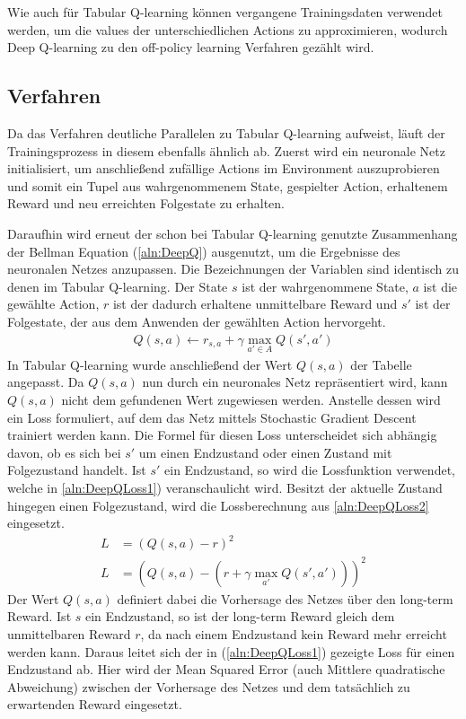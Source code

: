 \documentclass[11pt]{scrartcl}
\begin{document}
Wie auch für Tabular Q-learning können vergangene Trainingsdaten verwendet werden, um die
values der unterschiedlichen Actions zu approximieren, wodurch Deep Q-learning zu den
off-policy learning Verfahren gezählt wird.

\subsection{Verfahren}
\label{sec:deepq-procedure}
Da das Verfahren deutliche Parallelen zu Tabular Q-learning aufweist, läuft der
Trainingsprozess in diesem ebenfalls ähnlich ab. Zuerst wird ein neuronale Netz
initialisiert, um anschließend zufällige Actions im Environment auszuprobieren
und somit ein Tupel aus wahrgenommenem State, gespielter Action, erhaltenem
Reward und neu erreichten Folgestate zu erhalten.

Daraufhin wird erneut der schon bei Tabular Q-learning genutzte Zusammenhang der Bellman
Equation (\ref{aln:DeepQ}) ausgenutzt, um die Ergebnisse des neuronalen Netzes anzupassen.
Die Bezeichnungen der Variablen sind identisch zu denen im Tabular Q-learning. Der State
$s$ ist der wahrgenommene State, $a$ ist die gewählte Action, $r$ ist der dadurch
erhaltene unmittelbare Reward und $s'$ ist der Folgestate, der aus dem Anwenden der
gewählten Action hervorgeht.
\begin{align}
  Q(s, a) \leftarrow r_{s,a} + \gamma \max_{a' \in A}Q(s', a') \label{aln:DeepQ}
\end{align}
\noindent
In Tabular Q-learning wurde anschließend der Wert $Q(s, a)$ der Tabelle angepasst. Da 
$Q(s, a)$ nun durch ein neuronales Netz repräsentiert wird, kann $Q(s, a)$ nicht dem
gefundenen Wert zugewiesen werden. Anstelle dessen wird ein Loss formuliert, auf dem
das Netz mittels Stochastic Gradient Descent trainiert werden kann. Die Formel für
diesen Loss unterscheidet sich abhängig davon, ob es sich bei $s'$ um einen Endzustand
oder einen Zustand mit Folgezustand handelt. Ist $s'$ ein Endzustand, so wird die
Lossfunktion verwendet, welche in \autoref{aln:DeepQLoss1}) veranschaulicht wird.
Besitzt der aktuelle Zustand hingegen einen Folgezustand, wird die Lossberechnung
aus \autoref{aln:DeepQLoss2} eingesetzt.
\begin{align}
  L & = \left(Q(s, a) - r\right)^2 \label{aln:DeepQLoss1} \\
  L & = \left(Q(s, a) - \left(r + \gamma \max_{a'} Q(s', a')\right)\right)^2 \label{aln:DeepQLoss2}
\end{align}
\noindent
Der Wert $Q(s, a)$ definiert dabei die Vorhersage des Netzes über den long-term Reward.
Ist $s$ ein Endzustand, so ist der long-term Reward gleich dem unmittelbaren Reward $r$,
da nach einem Endzustand kein Reward mehr erreicht werden kann. Daraus leitet sich der in
(\ref{aln:DeepQLoss1}) gezeigte Loss für einen Endzustand ab. Hier wird der Mean Squared
Error (auch Mittlere quadratische Abweichung) zwischen der Vorhersage des Netzes und dem
tatsächlich zu erwartenden Reward eingesetzt.
\end{document}
